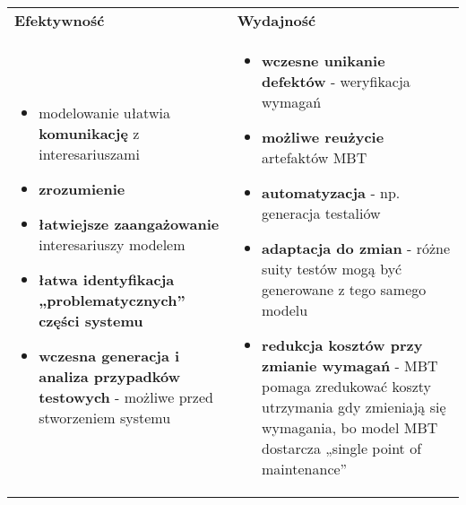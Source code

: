 \documentclass[../main.tex]{subfiles}
\begin{document}
    \begin{table}[H]
        \begin{center}
            \begin{tabular}{p{8cm} p{8cm}}
                \textbf{Efektywność} & \textbf{Wydajność}\\
                \begin{itemize}
                    \item modelowanie ułatwia \textbf{komunikację} z interesariuszami
                    \item \textbf{zrozumienie}
                    \item \textbf{łatwiejsze zaangażowanie} interesariuszy modelem
                    \item \textbf{łatwa identyfikacja „problematycznych” części systemu}
                    \item \textbf{wczesna generacja i analiza przypadków testowych} - możliwe przed stworzeniem systemu
                \end{itemize}
                &
                \begin{itemize}
                    \item \textbf{wczesne unikanie defektów} - weryfikacja wymagań
                    \item \textbf{możliwe reużycie} artefaktów MBT
                    \item \textbf{automatyzacja} - np. generacja testaliów
                    \item \textbf{adaptacja do zmian} - różne suity testów mogą być generowane z tego samego modelu
                    \item \textbf{redukcja kosztów przy zmianie wymagań} - MBT pomaga zredukować koszty utrzymania gdy
                    zmieniają się wymagania, bo model MBT dostarcza „single point of maintenance”
                \end{itemize}\\
            \end{tabular}
        \end{center}
    \end{table}
\end{document}
